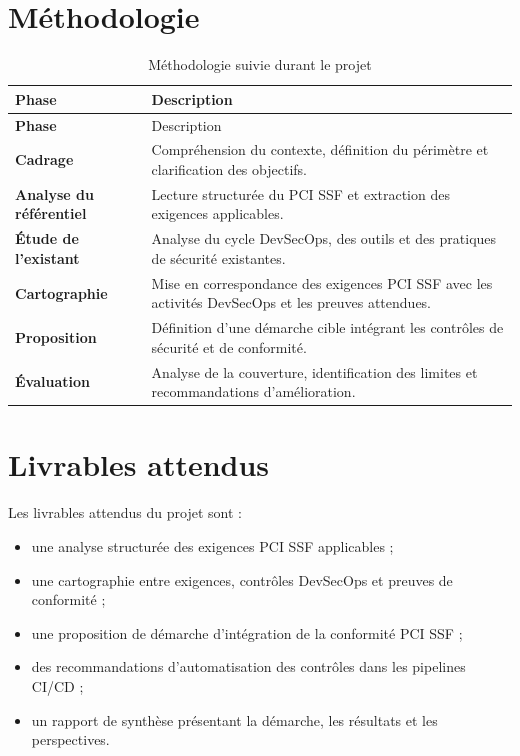 \section{Méthodologie}

\begin{longtable}{>{\bfseries}p{3.2cm}p{11cm}}
    \caption{Méthodologie suivie durant le projet}
    \label{tab:methode-projet} \\
    \toprule
    Phase & Description \\
    \midrule
    \endfirsthead
    \toprule
    Phase & Description \\
    \midrule
    \endhead
    Cadrage & Compréhension du contexte, définition du périmètre et clarification des objectifs. \\
    Analyse du référentiel & Lecture structurée du PCI SSF et extraction des exigences applicables. \\
    Étude de l'existant & Analyse du cycle DevSecOps, des outils et des pratiques de sécurité existantes. \\
    Cartographie & Mise en correspondance des exigences PCI SSF avec les activités DevSecOps et les preuves attendues. \\
    Proposition & Définition d'une démarche cible intégrant les contrôles de sécurité et de conformité. \\
    Évaluation & Analyse de la couverture, identification des limites et recommandations d'amélioration. \\
    \bottomrule
\end{longtable}

\section{Livrables attendus}

Les livrables attendus du projet sont :

\begin{itemize}
    \item une analyse structurée des exigences PCI SSF applicables ;
    \item une cartographie entre exigences, contrôles DevSecOps et preuves de conformité ;
    \item une proposition de démarche d'intégration de la conformité PCI SSF ;
    \item des recommandations d'automatisation des contrôles dans les pipelines CI/CD ;
    \item un rapport de synthèse présentant la démarche, les résultats et les perspectives.
\end{itemize}

